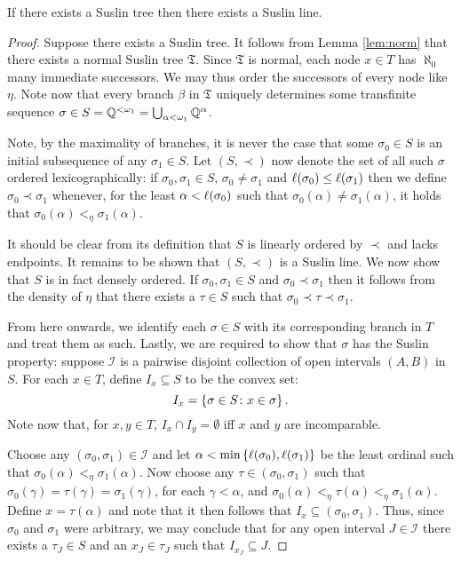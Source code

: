 \begin{lem}\label{lem:tline}
	If there exists a Suslin tree then there exists a Suslin line.
\end{lem}
\begin{proof}
	Suppose there exists a Suslin tree.  It follows from Lemma \ref{lem:norm}
	that there exists a normal Suslin tree $\mathfrak{T}$.  Since $\mathfrak{T}$ is
	normal, each node $x\in T$ has $\aleph_0$ many immediate successors.  We may
	thus order the successors of every node like $\eta$.  Note now that every
	branch $\beta$ in $\mathfrak{T}$ uniquely determines some transfinite sequence
	$\sigma\in S=\mathbb{Q}^{<\omega_1}=\bigcup_{\alpha<\omega_1}\mathbb{Q}^\alpha$.

	Note, by the maximality of branches, it is never the case that some
	$\sigma_0\in S$ is an initial subsequence of any $\sigma_1\in S$.  Let
	$(S,\prec)$ now denote the set of all such $\sigma$ ordered lexicographically:
	if $\sigma_0,\sigma_1\in S$, $\sigma_0\neq\sigma_1$ and
	$\ell(\sigma_0)\leq\ell(\sigma_1)$ then we define $\sigma_0\prec\sigma_1$
	whenever, for the least $\alpha<\ell(\sigma_0)$ such that
	$\sigma_0(\alpha)\neq\sigma_1(\alpha)$, it holds that
	$\sigma_0(\alpha)<_{\eta}\sigma_1(\alpha)$.

	It should be clear from its definition that $S$ is linearly ordered by
	$\prec$ and lacks endpoints.  It remains to be shown that $(S,\prec)$ is a
	Suslin line.  We now show that $S$ is in fact densely ordered.  If
	$\sigma_0,\sigma_1\in S$ and $\sigma_0\prec\sigma_1$ then it follows from the
	density of $\eta$ that there exists a $\tau\in S$ such that
	$\sigma_0\prec\tau\prec\sigma_1$.

	From here onwards, we identify each $\sigma\in S$ with its corresponding
	branch in $T$ and treat them as such.  Lastly, we are required to show that
	$\sigma$ has the Suslin property:  suppose $\mathcal{I}$ is a pairwise disjoint
	collection of open intervals $(A,B)$ in $S$.  For each $x\in T$, define
	$I_x\subseteq S$ to be the convex set:
	\begin{equation}
		I_x=\left\lbrace \sigma\in S\colon x\in \sigma \right\rbrace.
	\end{equation}
	Note now that, for $x,y\in T$, $I_x\cap I_y=\emptyset$ iff $x$ and $y$ are
	incomparable.

	Choose any $(\sigma_0,\sigma_1)\in\mathcal{I}$ and let
	$\alpha<\min\left\lbrace \ell(\sigma_0),\ell(\sigma_1)\right\rbrace$ be the least ordinal such
	that $\sigma_0(\alpha)<_{\eta}\sigma_1(\alpha)$.  Now choose any
	$\tau\in(\sigma_0,\sigma_1)$ such that
	$\sigma_0(\gamma)=\tau(\gamma)=\sigma_1(\gamma)$, for each $\gamma<\alpha$, and
	$\sigma_0(\alpha)<_{\eta}\tau(\alpha)<_{\eta}\sigma_1(\alpha)$.  Define $x=\tau(\alpha)$ and
	note that it then follows that $I_x\subseteq(\sigma_0,\sigma_1)$.  Thus, since
	$\sigma_0$ and $\sigma_1$ were arbitrary, we may conclude that for any open
	interval $J\in\mathcal{I}$ there exists a $\tau_J\in S$ and an $x_J\in\tau_J$
	such that $I_{x_J}\subseteq J$.


\end{proof}
